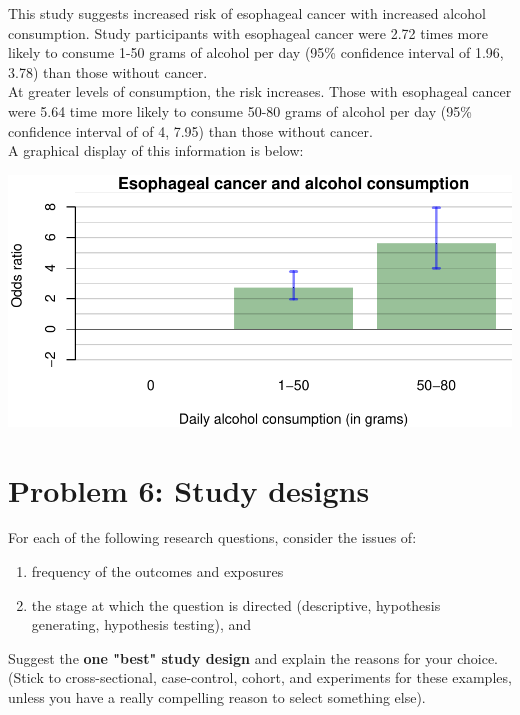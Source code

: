\documentclass[12pt]{article}
\begin{document}
\noindent This study suggests increased risk of esophageal cancer with increased alcohol consumption.  Study participants with esophageal cancer were 2.72 times more likely to consume 1-50 grams of alcohol per day (95\% confidence interval of 1.96, 3.78) than those without cancer.  \\

\noindent At greater levels of consumption, the risk increases.  Those with esophageal cancer were 5.64 time more likely to consume 50-80 grams of alcohol per day (95\% confidence interval of of 4, 7.95) than those without cancer. \\

\noindent A graphical display of this information is below:

\begin{center}
\includegraphics{homework2-005}
\end{center}
\newpage
\section*{Problem 6: Study designs}

\textcolor{black!50}{For each of the following research questions, consider the issues of: \begin{enumerate}
\item frequency of the outcomes and exposures
\item the stage at which the question is directed (descriptive, hypothesis generating, hypothesis testing), and \\
\end{enumerate}
\noindent Suggest the \textbf{one "best" study design} and explain the reasons for your choice.  (Stick to cross-sectional, case-control, cohort, and experiments for these examples, unless you have a really compelling reason to select something else).} \\
\end{document}

